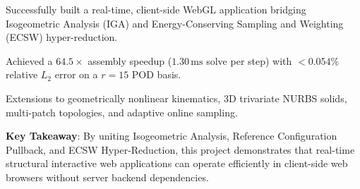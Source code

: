 \begin{tcolorbox}[colback=lightbg, colframe=primaryblue, title=\textbf{Chapter Summary: Achievements \& Research Impact}, fonttitle=\bfseries]
    \begin{description}[leftmargin=!, labelwidth=3.4cm]
        \item[\textbf{Core Result}] Successfully built a real-time, client-side WebGL application bridging Isogeometric Analysis (IGA) and Energy-Conserving Sampling and Weighting (ECSW) hyper-reduction.
        \item[\textbf{Speedup \& Accuracy}] Achieved a $64.5\times$ assembly speedup ($1.30\,\text{ms}$ solve per step) with $<0.054\%$ relative $L_2$ error on a $r=15$ POD basis.
        \item[\textbf{Future Horizons}] Extensions to geometrically nonlinear kinematics, 3D trivariate NURBS solids, multi-patch topologies, and adaptive online sampling.
    \end{description}
    
    \vspace{0.2cm}
    \textbf{Key Takeaway}: By uniting Isogeometric Analysis, Reference Configuration Pullback, and ECSW Hyper-Reduction, this project demonstrates that real-time structural interactive web applications can operate efficiently in client-side web browsers without server backend dependencies.
\end{tcolorbox}
